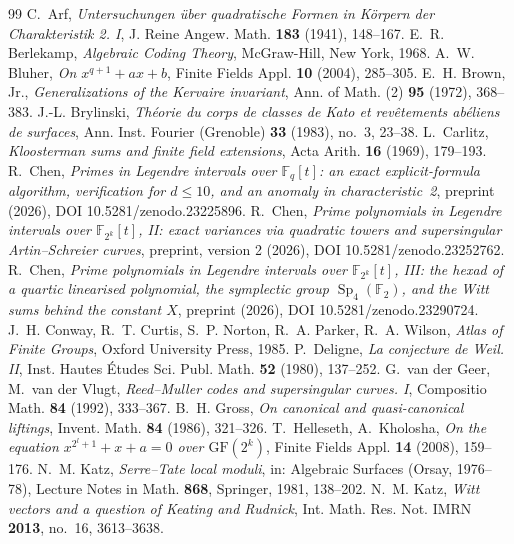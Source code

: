 \documentclass[12pt,a4paper]{amsart}
\theoremstyle{definition}
\newcommand{\F}{\mathbb{F}}
\newcommand{\Sp}{\operatorname{Sp}}
\begin{document}
\begin{thebibliography}{99}
 C.~Arf, \emph{Untersuchungen \"uber quadratische Formen in K\"orpern der Charakteristik 2. I}, J. Reine Angew. Math. \textbf{183} (1941), 148--167.
 E.~R. Berlekamp, \emph{Algebraic Coding Theory}, McGraw-Hill, New York, 1968.
 A.~W. Bluher, \emph{On $x^{q+1}+ax+b$}, Finite Fields Appl. \textbf{10} (2004), 285--305.
 E.~H. Brown, Jr., \emph{Generalizations of the Kervaire invariant}, Ann. of Math. (2) \textbf{95} (1972), 368--383.
 J.-L. Brylinski, \emph{Th\'eorie du corps de classes de Kato et rev\^etements ab\'eliens de surfaces}, Ann. Inst. Fourier (Grenoble) \textbf{33} (1983), no.~3, 23--38.
 L.~Carlitz, \emph{Kloosterman sums and finite field extensions}, Acta Arith. \textbf{16} (1969), 179--193.
 R.~Chen, \emph{Primes in Legendre intervals over $\F_q[t]$: an exact explicit-formula algorithm, verification for $d\le10$, and an anomaly in characteristic~2}, preprint (2026), DOI 10.5281/zenodo.23225896.
 R.~Chen, \emph{Prime polynomials in Legendre intervals over $\F_{2^k}[t]$, II: exact variances via quadratic towers and supersingular Artin--Schreier curves}, preprint, version 2 (2026), DOI 10.5281/zenodo.23252762.
 R.~Chen, \emph{Prime polynomials in Legendre intervals over $\F_{2^k}[t]$, III: the hexad of a quartic linearised polynomial, the symplectic group $\Sp_4(\F_2)$, and the Witt sums behind the constant $X$}, preprint (2026), DOI 10.5281/zenodo.23290724.
 J.~H. Conway, R.~T. Curtis, S.~P. Norton, R.~A. Parker, R.~A. Wilson, \emph{Atlas of Finite Groups}, Oxford University Press, 1985.
 P.~Deligne, \emph{La conjecture de Weil. II}, Inst. Hautes \'Etudes Sci. Publ. Math. \textbf{52} (1980), 137--252.
 G.~van der Geer, M.~van der Vlugt, \emph{Reed--Muller codes and supersingular curves. I}, Compositio Math. \textbf{84} (1992), 333--367.
 B.~H. Gross, \emph{On canonical and quasi-canonical liftings}, Invent. Math. \textbf{84} (1986), 321--326.
 T.~Helleseth, A.~Kholosha, \emph{On the equation $x^{2^l+1}+x+a=0$ over $\mathrm{GF}(2^k)$}, Finite Fields Appl. \textbf{14} (2008), 159--176.
 N.~M. Katz, \emph{Serre--Tate local moduli}, in: Algebraic Surfaces (Orsay, 1976--78), Lecture Notes in Math. \textbf{868}, Springer, 1981, 138--202.
 N.~M. Katz, \emph{Witt vectors and a question of Keating and Rudnick}, Int. Math. Res. Not. IMRN \textbf{2013}, no.~16, 3613--3638.

\end{thebibliography}
\end{document}
